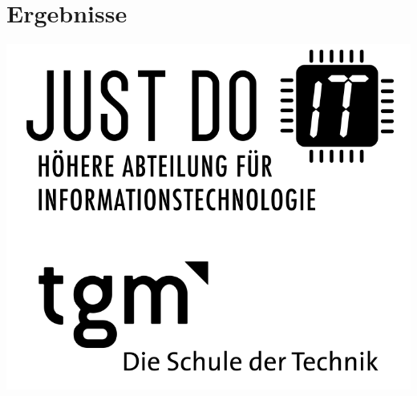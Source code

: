 
\section{Ergebnisse}
\label{sec:Ergebnisse}

\begin{minipage}{\linewidth}
	\centering
	\includegraphics[width=0.8\linewidth]{images/jdIT_tgm}
\end{minipage}
